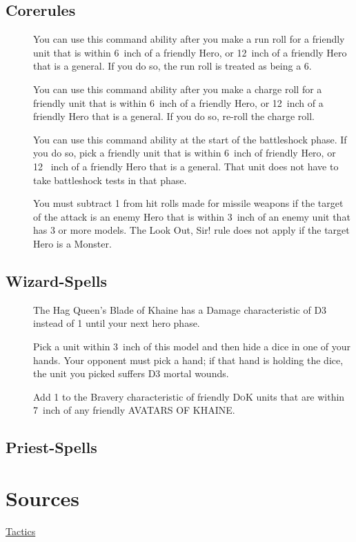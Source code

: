 \subsection{Corerules}
\begin{description}
    \item [] You can use this
        command ability after you make a run roll for a friendly unit that is
        within 6~inch of a friendly Hero, or
        12~inch of a friendly Hero that is a general.  If you do so, the run
        roll is treated as being a 6.  
    \item [] You can use
        this command ability after you make a charge roll for a friendly unit
        that is within 6~inch of a friendly Hero, or 12~inch of a friendly Hero
        that is a general.  If you do so, re-roll the charge roll.  
    \item [] You can use
        this command ability at the start of the battleshock phase. If you do
        so, pick a friendly unit that is within 6~inch of friendly Hero, or 12~
        inch  of a friendly Hero that is a general. That unit does not have to
        take battleshock tests in that phase.
    \item [] You must subtract
        1 from hit rolls made for missile weapons if the target of the attack
        is an enemy Hero that is within 3~inch of an enemy unit that has 3 or
        more models. The Look Out, Sir! rule does not apply if the target Hero
        is a Monster.
\end{description}

\subsection{Wizard-Spells}
\begin{description}
  \item [] The Hag Queen's Blade of
      Khaine has a Damage characteristic of D3 instead of
      1 until your next hero phase.
  \item [] Pick a unit within
      3~inch of this model and then hide a dice in one of your hands.  Your
      opponent must pick a hand; if that hand is holding the dice, the unit you
      picked suffers D3 mortal wounds.
    \item [] Add 1 to the Bravery
        characteristic of friendly \textsc{DoK} units that are within 7~inch
        of any friendly AVATARS OF KHAINE.
\end{description}
\subsection{Priest-Spells}

\section{Sources}
\href{https://1d4chan.org/wiki/Age_of_Sigmar/Tactics/Order/Daughters_of_Khaine}{Tactics}

